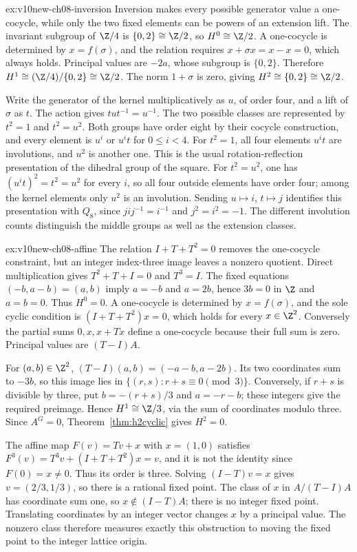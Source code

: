 \begin{solution}{ex:v10new-ch08-inversion}
\idea Inversion makes every possible generator value a one-cocycle, while only the two fixed elements can be powers of an extension lift.
\writeup The invariant subgroup of $\Z/4$ is $\{0,2\}\cong\Z/2$, so $H^0\cong\Z/2$. A one-cocycle is determined by $x=f(\sigma)$, and the relation requires $x+\sigma x=x-x=0$, which always holds. Principal values are $-2a$, whose subgroup is $\{0,2\}$. Therefore $H^1\cong(\Z/4)/\{0,2\}\cong\Z/2$. The norm $1+\sigma$ is zero, giving $H^2\cong\{0,2\}\cong\Z/2$.

Write the generator of the kernel multiplicatively as $u$, of order four, and a lift of $\sigma$ as $t$. The action gives $tut^{-1}=u^{-1}$. The two possible classes are represented by $t^2=1$ and $t^2=u^2$. Both groups have order eight by their cocycle construction, and every element is $u^i$ or $u^it$ for $0\le i<4$.
For $t^2=1$, all four elements $u^it$ are involutions, and $u^2$ is another one. This is the usual rotation-reflection presentation of the dihedral group of the square.
For $t^2=u^2$, one has $(u^it)^2=t^2=u^2$ for every $i$, so all four outside elements have order four; among the kernel elements only $u^2$ is an involution. Sending $u\mapsto i$, $t\mapsto j$ identifies this presentation with $Q_8$, since $jij^{-1}=i^{-1}$ and $j^2=i^2=-1$. The different involution counts distinguish the middle groups as well as the extension classes.
\end{solution}

\begin{solution}{ex:v10new-ch08-affine}
\idea The relation $I+T+T^2=0$ removes the one-cocycle constraint, but an integer index-three image leaves a nonzero quotient.
\writeup Direct multiplication gives $T^2+T+I=0$ and $T^3=I$. The fixed equations
$(-b,a-b)=(a,b)$ imply $a=-b$ and $a=2b$, hence $3b=0$ in $\Z$ and $a=b=0$. Thus $H^0=0$. A one-cocycle is determined by $x=f(\sigma)$, and the sole cyclic condition is
$(I+T+T^2)x=0$, which holds for every $x\in\Z^2$. Conversely the partial sums $0,x,x+Tx$ define a one-cocycle because their full sum is zero. Principal values are $(T-I)A$.

For $(a,b)\in\Z^2$,
$(T-I)(a,b)=(-a-b,a-2b)$.
Its two coordinates sum to $-3b$, so this image lies in
$\{(r,s):r+s\equiv0\pmod3\}$. Conversely, if $r+s$ is divisible by three, put $b=-(r+s)/3$ and $a=-r-b$; these integers give the required preimage. Hence
$H^1\cong\Z/3$, via the sum of coordinates modulo three. Since $A^G=0$, Theorem~\ref{thm:h2cyclic} gives $H^2=0$.

The affine map $F(v)=Tv+x$ with $x=(1,0)$ satisfies
$F^3(v)=T^3v+(I+T+T^2)x=v$, and it is not the identity since $F(0)=x\ne0$. Thus its order is three. Solving $(I-T)v=x$ gives $v=(2/3,1/3)$, so there is a rational fixed point. The class of $x$ in $A/(T-I)A$ has coordinate sum one, so $x\notin(I-T)A$; there is no integer fixed point. Translating coordinates by an integer vector changes $x$ by a principal value. The nonzero class therefore measures exactly this obstruction to moving the fixed point to the integer lattice origin.
\end{solution}

